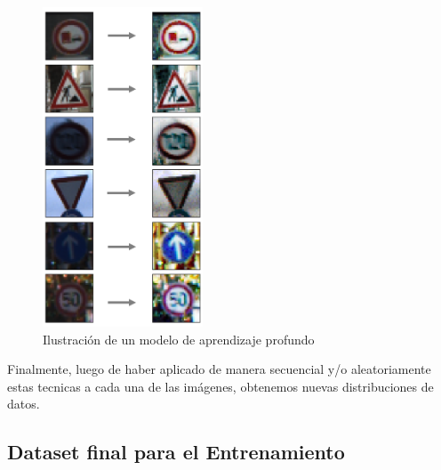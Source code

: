 			\begin{figure}[H]
				\begin{center}
				\includegraphics[height=9.5cm]{images/desarrollo/Augment/equalize_hist2_wo_Norm_woRepetition}
				\end{center}
				\begin{center}
				\caption{\small{Ilustración de un modelo de aprendizaje profundo}}
				\vspace{-1em}
			{\small{\fontsize{10}{16.8}\selectfont {Fuente propia}}}
				\end{center}
				\vspace{-1.5em}
			\end{figure}
		
		
		Finalmente, luego de haber aplicado de manera secuencial y/o aleatoriamente estas tecnicas a cada una de las imágenes, obtenemos nuevas distribuciones de datos. 

	\newpage
	\subsection{Dataset final para el Entrenamiento}

